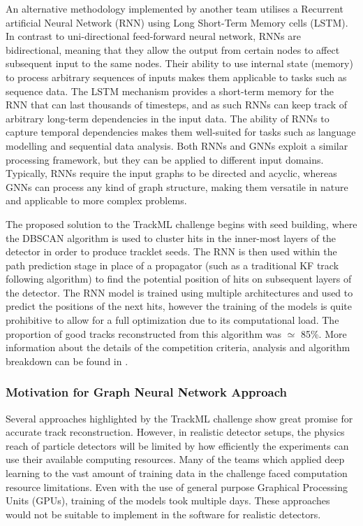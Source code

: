An alternative methodology implemented by another team utilises a Recurrent artificial Neural Network (RNN) using Long Short-Term Memory cells (LSTM). In contrast to uni-directional feed-forward neural network, RNNs are bidirectional, meaning that they allow the output from certain nodes to affect subsequent input to the same nodes. Their ability to use internal state (memory) to process arbitrary sequences of inputs makes them applicable to tasks such as sequence data. The LSTM mechanism provides a short-term memory for the RNN that can last thousands of timesteps, and as such RNNs can keep track of arbitrary long-term dependencies in the input data. The ability of RNNs to capture temporal dependencies makes them well-suited for tasks such as language modelling and sequential data analysis. Both RNNs and GNNs exploit a similar processing framework, but they can be applied to different input domains. Typically, RNNs require the input graphs to be directed and acyclic, whereas GNNs can process any kind of graph structure, making them versatile in nature and applicable to more complex problems.

The proposed solution to the TrackML challenge begins with seed building, where the DBSCAN algorithm is used to cluster hits in the inner-most layers of the detector in order to produce tracklet seeds. The RNN is then used within the path prediction stage in place of a propagator (such as a traditional KF track following algorithm) to find the potential position of hits on subsequent layers of the detector. The RNN model is trained using multiple architectures and used to predict the positions of the next hits, however the training of the models is quite prohibitive to allow for a full optimization due to its computational load. The proportion of good tracks reconstructed from this algorithm was $\simeq$ 85\%. More information about the details of the competition criteria, analysis and algorithm breakdown can be found in \cite{Amrouche_2019}.


\subsubsection{Motivation for Graph Neural Network Approach}
Several approaches highlighted by the TrackML challenge show great promise for accurate track reconstruction. However, in realistic detector setups, the physics reach of particle detectors will be limited by how efficiently the experiments can use their available computing resources. Many of the teams which applied deep learning to the vast amount of training data in the challenge faced computation resource limitations. Even with the use of general purpose Graphical Processing Units (GPUs), training of the models took multiple days. These approaches would not be suitable to implement in the software for realistic detectors.

